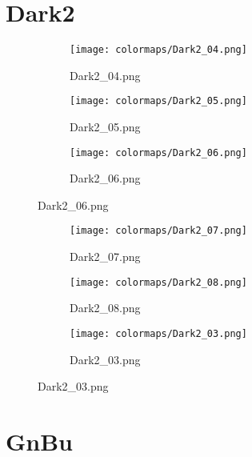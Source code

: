 \documentclass{article}%
\begin{document}
%
\newpage%
\section{Dark2}%
\label{sec:Dark2}%
\hspace{1cm}\hfill%
\hspace{1cm}\hfill%
\hspace{1cm}\hfill%


\begin{figure}[h!]%
\begin{subfigure}[b]{0.3\linewidth}%
\texttt{[image: colormaps/Dark2\_04.png]}%
\caption{Dark2\_04.png}%
\end{subfigure}%
\begin{subfigure}[b]{0.3\linewidth}%
\texttt{[image: colormaps/Dark2\_05.png]}%
\caption{Dark2\_05.png}%
\end{subfigure}%
\begin{subfigure}[b]{0.3\linewidth}%
\texttt{[image: colormaps/Dark2\_06.png]}%
\caption{Dark2\_06.png}%
\end{subfigure}%
\end{figure}

%
\hspace{1cm}\hfill%
\hspace{1cm}\hfill%
\hspace{1cm}\hfill%


\begin{figure}[h!]%
\begin{subfigure}[b]{0.3\linewidth}%
\texttt{[image: colormaps/Dark2\_07.png]}%
\caption{Dark2\_07.png}%
\end{subfigure}%
\begin{subfigure}[b]{0.3\linewidth}%
\texttt{[image: colormaps/Dark2\_08.png]}%
\caption{Dark2\_08.png}%
\end{subfigure}%
\begin{subfigure}[b]{0.3\linewidth}%
\texttt{[image: colormaps/Dark2\_03.png]}%
\caption{Dark2\_03.png}%
\end{subfigure}%
\end{figure}

%
\newpage%
\section{GnBu}%
\label{sec:GnBu}%
\hspace{1cm}\hfill%
\hspace{1cm}\hfill%
\hspace{1cm}\hfill%
\end{document}
